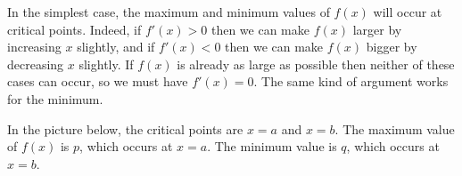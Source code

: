 \documentclass[reqno]{amsart}
\theoremstyle{definition}
\begin{document}
In the simplest case, the maximum and minimum values of $f(x)$ will
occur at critical points.  Indeed, if $f'(x)>0$ then we can make
$f(x)$ larger by increasing $x$ slightly, and if $f'(x)<0$ then we can
make $f(x)$ bigger by decreasing $x$ slightly.  If $f(x)$ is already
as large as possible then neither of these cases can occur, so we must
have $f'(x)=0$.  The same kind of argument works for the minimum.

In the picture below, the critical points are $x=a$ and $x=b$.  The
maximum value of $f(x)$ is $p$, which occurs at $x=a$.  The minimum
value is $q$, which occurs at $x=b$. 
\begin{center}
\end{center}
\end{document}
